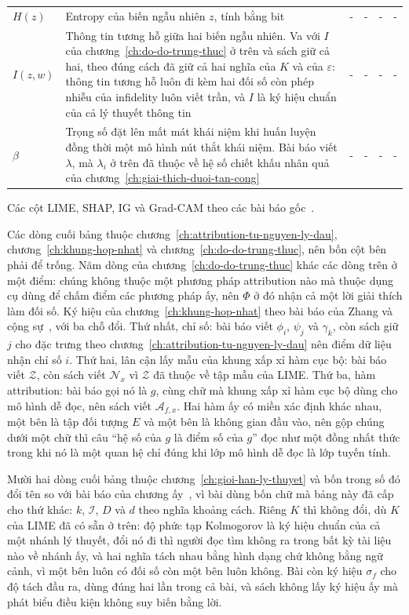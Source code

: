 \begin{longtable}{@{}lp{\kyhieuw}p{\kyhieuwmap}p{\kyhieuwmap}p{\kyhieuwmap}p{\kyhieuwlast}@{}}
$H(z)$ & Entropy của biến ngẫu nhiên $z$, tính bằng bit & - & - & - & - \\
$I(z,w)$ & Thông tin tương hỗ giữa hai biến ngẫu nhiên. Va với $I$ của chương~\ref{ch:do-do-trung-thuc} ở trên và sách giữ cả hai, theo đúng cách đã giữ cả hai nghĩa của $K$ và của $\varepsilon$: thông tin tương hỗ luôn đi kèm hai đối số còn phép nhiễu của infidelity luôn viết trần, và $I$ là ký hiệu chuẩn của cả lý thuyết thông tin & - & - & - & - \\
$\beta$ & Trọng số đặt lên mất mát khái niệm khi huấn luyện đồng thời một mô hình nút thắt khái niệm. Bài báo viết $\lambda$, mà $\lambda_i$ ở trên đã thuộc về hệ số chiết khấu nhân quả của chương~\ref{ch:giai-thich-duoi-tan-cong} & - & - & - & - \\
\bottomrule
\end{longtable}

Các cột LIME, SHAP, IG và Grad-CAM theo các bài báo gốc~\autocite{p09lime,p10shap,p11ig,p12gradcam}.

Các dòng cuối bảng thuộc chương~\ref{ch:attribution-tu-nguyen-ly-dau},
chương~\ref{ch:khung-hop-nhat} và chương~\ref{ch:do-do-trung-thuc}, nên bốn cột
bên phải để trống. Năm dòng của chương~\ref{ch:do-do-trung-thuc} khác các dòng
trên ở một điểm: chúng không thuộc một phương pháp attribution nào mà thuộc
dụng cụ dùng để chấm điểm các phương pháp ấy, nên $\Phi$ ở đó nhận cả một lời
giải thích làm đối số. Ký hiệu của
chương~\ref{ch:khung-hop-nhat} theo bài báo của Zhang và cộng
sự~\autocite{p18unified}, với ba chỗ đổi. Thứ nhất, chỉ số: bài báo viết
$\phi_i$, $\psi_j$ và $\gamma_k$, còn sách giữ $j$ cho đặc trưng theo
chương~\ref{ch:attribution-tu-nguyen-ly-dau} nên điểm dữ liệu nhận chỉ số $i$.
Thứ hai, lân cận lấy mẫu của khung xấp xỉ hàm cục bộ: bài báo viết $\mathcal{Z}$,
còn sách viết $\mathcal{N}_x$ vì $\mathcal{Z}$ đã thuộc về tập mẫu của LIME.
Thứ ba, hàm attribution: bài báo gọi nó là $g$, cùng chữ mà khung xấp xỉ hàm cục
bộ dùng cho mô hình dễ đọc, nên sách viết $\mathcal{A}_{f,x}$. Hai hàm ấy có
miền xác định khác nhau, một bên là tập đối tượng $E$ và một bên là không gian
đầu vào, nên gộp chúng dưới một chữ thì câu \enquote{hệ số của $g$ là điểm số
của $g$} đọc như một đồng nhất thức trong khi nó là một quan hệ chỉ đúng khi lớp
mô hình dễ đọc là lớp tuyến tính.

Mười hai dòng cuối bảng thuộc chương~\ref{ch:gioi-han-ly-thuyet} và bốn trong số
đó đổi tên so với bài báo của chương ấy~\autocite{p26limits}, vì bài dùng bốn
chữ mà bảng này đã cấp cho thứ khác: $k$, $\mathcal{I}$, $D$ và $d$ theo nghĩa
khoảng cách. Riêng $K$ thì không đổi, dù $K$ của LIME đã có sẵn ở trên: độ phức
tạp Kolmogorov là ký hiệu chuẩn của cả một nhánh lý thuyết, đổi nó đi thì người
đọc tìm không ra trong bất kỳ tài liệu nào về nhánh ấy, và hai nghĩa tách nhau
bằng hình dạng chứ không bằng ngữ cảnh, vì một bên luôn có đối số còn một bên
luôn không. Bài còn ký hiệu $\sigma_f$ cho độ tách đầu ra, dùng đúng hai lần
trong cả bài, và sách không lấy ký hiệu ấy mà phát biểu điều kiện không suy biến
bằng lời.

